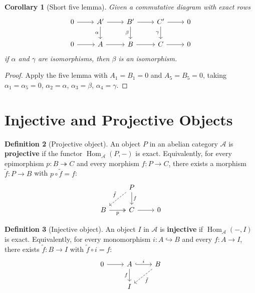 \documentclass[a4paper,12pt]{book}
\DeclareMathOperator{\Hom}{Hom}
\theoremstyle{definition}
\newtheorem{definition}{Definition}[section]
\theoremstyle{plain}
\newtheorem{corollary}[definition]{Corollary}
\theoremstyle{remark}
\begin{document}
\begin{corollary}[Short five lemma]\label{cor:short-five-lemma}
Given a commutative diagram with exact rows
\[
\begin{tikzcd}
    0 \arrow[r] & A' \arrow[r] \arrow[d, "\alpha"'] & B' \arrow[r] \arrow[d, "\beta"'] & C' \arrow[r] \arrow[d, "\gamma"'] & 0 \\
    0 \arrow[r] & A \arrow[r] & B \arrow[r] & C \arrow[r] & 0
\end{tikzcd}
\]
if $\alpha$ and $\gamma$ are isomorphisms, then $\beta$ is an isomorphism.
\end{corollary}

\begin{proof}
Apply the five lemma with $A_1 = B_1 = 0$ and $A_5 = B_5 = 0$, taking
$\alpha_1 = \alpha_5 = 0$, $\alpha_2 = \alpha$, $\alpha_3 = \beta$, $\alpha_4 = \gamma$.
\end{proof}


\section{Injective and Projective Objects}\label{sec:inj-proj}

\begin{definition}[Projective object]\label{def:projective}
An object $P$ in an abelian category $\mathcal{A}$ is \textbf{projective} if the
functor $\Hom_{\mathcal{A}}(P, -)$ is exact. Equivalently, for every epimorphism
$p \colon B \twoheadrightarrow C$ and every morphism $f \colon P \to C$, there exists
a morphism $\tilde{f} \colon P \to B$ with $p \circ \tilde{f} = f$:
\[
\begin{tikzcd}
    & P \arrow[d, "f"] \arrow[dl, dashed, "\tilde{f}"'] \\
    B \arrow[r, "p"', twoheadrightarrow] & C \arrow[r] & 0
\end{tikzcd}
\]
\end{definition}

\begin{definition}[Injective object]\label{def:injective}
An object $I$ in $\mathcal{A}$ is \textbf{injective} if $\Hom_{\mathcal{A}}(-, I)$ is exact.
Equivalently, for every monomorphism $i \colon A \hookrightarrow B$ and every
$f \colon A \to I$, there exists $\tilde{f} \colon B \to I$ with $\tilde{f} \circ i = f$:
\[
\begin{tikzcd}
    0 \arrow[r] & A \arrow[r, hookrightarrow, "i"] \arrow[d, "f"'] & B \arrow[dl, dashed, "\tilde{f}"] \\
    & I &
\end{tikzcd}
\]
\end{definition}
\end{document}
